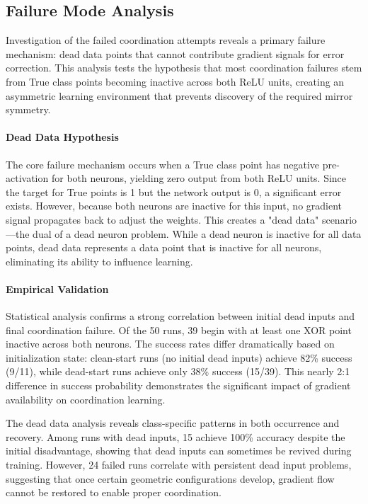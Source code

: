
\subsection*{Failure Mode Analysis}

Investigation of the failed coordination attempts reveals a primary failure mechanism: dead data points that cannot contribute gradient signals for error correction. This analysis tests the hypothesis that most coordination failures stem from True class points becoming inactive across both ReLU units, creating an asymmetric learning environment that prevents discovery of the required mirror symmetry.

\paragraph{Dead Data Hypothesis}
The core failure mechanism occurs when a True class point has negative pre-activation for both neurons, yielding zero output from both ReLU units. Since the target for True points is 1 but the network output is 0, a significant error exists. However, because both neurons are inactive for this input, no gradient signal propagates back to adjust the weights. This creates a "dead data" scenario—the dual of a dead neuron problem. While a dead neuron is inactive for all data points, dead data represents a data point that is inactive for all neurons, eliminating its ability to influence learning.

\paragraph{Empirical Validation}
Statistical analysis confirms a strong correlation between initial dead inputs and final coordination failure. Of the 50 runs, 39 begin with at least one XOR point inactive across both neurons. The success rates differ dramatically based on initialization state: clean-start runs (no initial dead inputs) achieve 82\% success (9/11), while dead-start runs achieve only 38\% success (15/39). This nearly 2:1 difference in success probability demonstrates the significant impact of gradient availability on coordination learning.

The dead data analysis reveals class-specific patterns in both occurrence and recovery. Among runs with dead inputs, 15 achieve 100\% accuracy despite the initial disadvantage, showing that dead inputs can sometimes be revived during training. However, 24 failed runs correlate with persistent dead input problems, suggesting that once certain geometric configurations develop, gradient flow cannot be restored to enable proper coordination.

